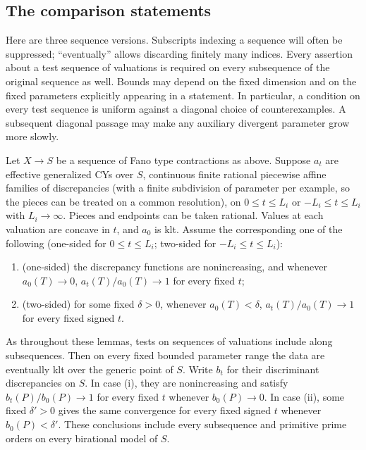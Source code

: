 \subsection{The comparison statements}

Here are three sequence versions.
Subscripts indexing a sequence will often be suppressed; ``eventually''
allows discarding finitely many indices.  Every assertion about a test
sequence of valuations is required on every subsequence of the original
sequence as well.  Bounds may depend on the fixed dimension and on the
fixed parameters explicitly appearing in a statement.  In particular,
a condition on every test sequence is uniform against a diagonal choice
of counterexamples.  A subsequent diagonal passage may make any
auxiliary divergent parameter grow more slowly.

\begin{lemma}\label{lem:A-comparison} Let \(X\to S\) be a sequence of Fano type contractions as above.
Suppose \(a_t\) are effective generalized CYs over \(S\), continuous finite rational piecewise affine families of discrepancies (with a finite subdivision of parameter per example, so the pieces can be treated on a common resolution), on \(0\le t\le L_i\) or \(-L_i\le t\le L_i\) with \(L_i\to\infty\).
Pieces and endpoints can be taken rational.
Values at each valuation are concave in \(t\), and \(a_0\) is klt.
Assume the corresponding one of the following (one-sided for \(0\le t\le L_i\); two-sided for \(-L_i\le t\le L_i\)):
\begin{enumerate}[label=\textup{(\roman*)}]
\item (one-sided) the discrepancy functions are nonincreasing, and whenever \(a_0(T)\to0\), \(a_t(T)/a_0(T)\to1\) for every fixed \(t\);
\item (two-sided) for some fixed \(\delta>0\), whenever \(a_0(T)<\delta\), \(a_t(T)/a_0(T)\to1\) for every fixed signed \(t\).
\end{enumerate}

As throughout these lemmas, tests on sequences of valuations include along subsequences.
Then on every fixed bounded parameter range the data are eventually klt
over the generic point of \(S\).  Write \(b_t\) for their discriminant
discrepancies on \(S\).  In case \textup{(i)}, they are nonincreasing
and satisfy \(b_t(P)/b_0(P)\to1\) for every fixed \(t\) whenever
\(b_0(P)\to0\).  In case \textup{(ii)}, some fixed \(\delta'>0\)
gives the same convergence for every fixed signed \(t\) whenever
\(b_0(P)<\delta'\).  These conclusions include every subsequence and
primitive prime orders on every birational model of \(S\).

\end{lemma}

